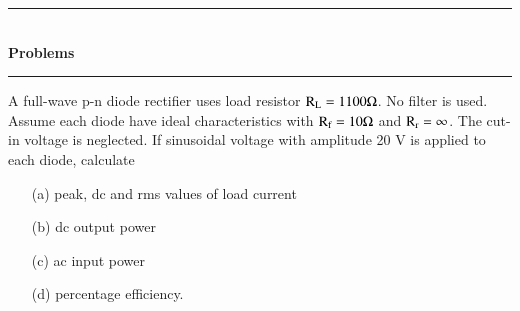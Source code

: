\medskip

\begin{center}
\rule{4cm}{1pt}\\
{\bf\Large Problems}\\[-3pt]
\rule{4cm}{1pt}
\end{center}

\begin{problem}\label{prob1.9}
A full-wave p-n diode rectifier uses load resistor $\textrm{R}_{\textrm{L}}=1100\Omega$. No filter is used. Assume each diode have ideal characteristics with $\textrm{R}_{\textrm{f}}=10\Omega$ and $\textrm{R}_{\textrm{r}}=\infty$. The cut-in voltage is neglected. If sinusoidal voltage with amplitude 20 V is applied to each diode, calculate
\begin{itemize}
\item[(a)] peak, dc and rms values of load current

\item[(b)] dc output power

\item[(c)] ac input power

\item[(d)] percentage efficiency.
\end{itemize}
\end{problem}


